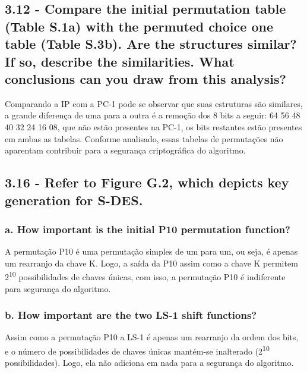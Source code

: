 \documentclass[
    article,            %
    11pt,               %
    oneside,            %
    a4paper,            %
    english,            %
    brazil,             %
    sumario=tradicional,
    ]{abntex2}
\begin{document}
\subsection*{\textbf{3.12 - Compare the initial permutation table (Table S.1a) with the permuted choice one table (Table S.3b). Are the structures similar? If so, describe the similarities. What conclusions can you draw from this analysis?}}

Comparando a IP com a PC-1 pode se observar que suas estruturas são similares, a grande diferença de uma para a outra é a remoção dos 8 bits a seguir: 64 56 48 40 32 24 16 08, que não estão presentes na PC-1, os bits restantes estão presentes em ambas as tabelas. Conforme analisado, essas tabelas de permutações não aparentam contribuir para a segurança criptográfica do algoritmo.



\subsection*{\textbf{3.16 - Refer to Figure G.2, which depicts key generation for S-DES.}}
\subsubsection*{\textbf{a. How important is the initial P10 permutation function?}}

A permutação P10 é uma permutação simples de um para um, ou seja, é apenas um rearranjo da chave K. Logo, a saída da P10 assim como a chave K permitem 2\textsuperscript{10} possibilidades de chaves únicas, com isso, a permutação P10 é indiferente para segurança do algoritmo.  

\subsubsection*{\textbf{b. How important are the two LS-1 shift functions?}}

Assim como a permutação P10 a LS-1 é apenas um rearranjo da ordem dos bits, e o número de possibilidades de chaves únicas mantém-se inalterado (2\textsuperscript{10} possibilidades). Logo, ela não adiciona em nada para a segurança do algoritmo.


\end{document}
